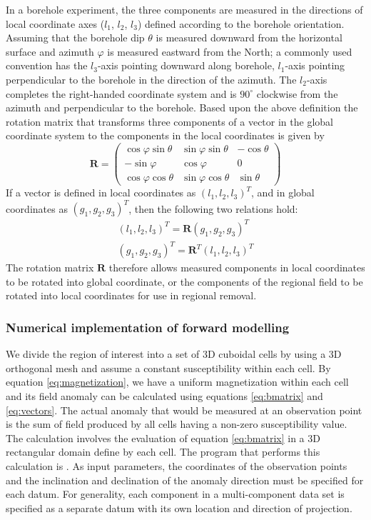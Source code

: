 In a borehole experiment, the three components are measured in the directions of local coordinate axes ($l_1$, $l_2$, $l_3$) defined according to the borehole orientation. Assuming that the borehole dip $\theta$ is measured downward from the horizontal surface and azimuth $\varphi$ is measured eastward from the North; a commonly used convention has the $l_3$-axis pointing downward along borehole, $l_1$-axis pointing perpendicular to the borehole in the direction of the azimuth. The $l_2$-axis
completes the right-handed coordinate system and is $90^\circ$ clockwise from the azimuth and perpendicular to the borehole. Based upon the above definition the rotation matrix that transforms three components of a vector in the global coordinate system to the components in the local coordinates is given by
\begin{equation}
\label{eq:rotation}
\mathbf{R}=\left( \begin{array}{ccc}
\cos\varphi \sin\theta & \sin\varphi \sin\theta & -\cos\theta \\
-\sin\varphi & \cos\varphi & 0\\
\cos\varphi \cos\theta & \sin\varphi \cos\theta & \sin\theta
\end{array} \right)
\end{equation}
If a vector is defined in local coordinates as $(l_1,l_2,l_3)^T$, and in global coordinates as $(g_1,g_2,g_3)^T$, then the following two relations hold:
\begin{eqnarray}
\label{eq:vectors}
(l_1,l_2,l_3)^T = \mathbf{R}(g_1,g_2,g_3)^T \nonumber \\
(g_1,g_2,g_3)^T = \mathbf{R}^T(l_1,l_2,l_3)^T
\end{eqnarray}
%
The rotation matrix $\mathbf{R}$ therefore allows measured components in local coordinates to be rotated into global coordinate, or the components of the regional field to be rotated into local coordinates for use in regional removal.

\subsubsection{Numerical implementation of forward modelling}

We divide the region of interest into a set of 3D cuboidal cells by using a 3D orthogonal mesh and assume a constant susceptibility within each cell. By equation \ref{eq:magnetization}, we have a uniform magnetization within each cell and its field anomaly can be calculated using equations \ref{eq:bmatrix} and \ref{eq:vectors}. The actual anomaly that would be measured at an observation point is the sum of field produced by all cells having a non-zero susceptibility value. The calculation involves the evaluation of equation \ref{eq:bmatrix} in a 3D rectangular domain define by each cell. The program that performs this calculation is . As input parameters, the coordinates of the observation points and the inclination and declination of the anomaly direction must be specified for each datum. For generality, each component in a multi-component data set is specified as a separate datum with its own location and direction of projection.

